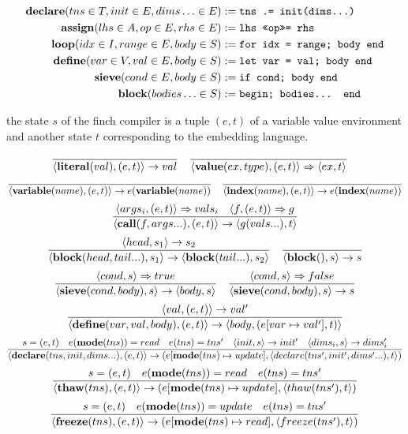 \begin{align*}
    \text{\textbf{declare}}(tns \in T, init \in E, dims\ldots \in E) &:= \text{\texttt{tns .= init(dims...)}} \\
    \text{\textbf{assign}}(lhs \in A, op \in E, rhs \in E) &:= \text{\texttt{lhs \texttt{<<op>>=} rhs}} \\
    \text{\textbf{loop}}(idx \in I, range \in E, body \in S) &:= \text{\texttt{for idx = range; body end}} \\
    \text{\textbf{define}}(var \in V, val \in E, body \in S) &:= \text{\texttt{let var = val; body end}} \\
    \text{\textbf{sieve}}(cond \in E, body \in S) &:= \text{\texttt{if cond; body end}} \\
    \text{\textbf{block}}(bodies\ldots \in S) &:= \text{\texttt{begin; bodies... end}}
\end{align*}

the state $s$ of the finch compiler is a tuple $(e, t)$ of a variable value
environment and another state $t$ corresponding to the embedding language.



\[
    \frac{}{\langle\text{\textbf{literal}}(val), (e, t)\rangle \rightarrow val} \quad
    \frac{}{\langle\text{\textbf{value}}(ex, type), (e, t)\rangle \Rightarrow \langle ex, t \rangle} \quad
\]
\[
    \frac{}{\langle\text{\textbf{variable}}(name), (e, t)\rangle \rightarrow e(\text{\textbf{variable}}(name))} \quad
    \frac{}{\langle\text{\textbf{index}}(name), (e, t)\rangle \rightarrow e(\text{\textbf{index}}(name))}
\]
\[
    \frac{\langle args_i, (e, t) \rangle \Rightarrow vals_i \quad \langle f, (e, t) \rangle \Rightarrow g}
    {\langle\text{\textbf{call}}(f, args...), (e, t)\rangle \rightarrow \langle g(vals...), t \rangle}
\]
\[
\frac{\langle head, s_1 \rangle \rightarrow s_2}
{\langle\text{\textbf{block}}(head, tail...), s_1 \rangle \rightarrow \langle \text{\textbf{block}}(tail...), s_2 \rangle} \quad
\frac{}{\langle\text{\textbf{block}}(), s\rangle \rightarrow s}
\]
\[
\frac{\langle cond, s \rangle \Rightarrow true}
{\langle\text{\textbf{sieve}}(cond, body), s\rangle \rightarrow \langle body, s \rangle}\quad
\frac{\langle cond, s \rangle \Rightarrow false}
{\langle\text{\textbf{sieve}}(cond, body), s\rangle \rightarrow s}
\]
\[
\frac{\langle val, (e, t) \rangle \rightarrow val'}
{\langle\text{\textbf{define}}(var, val, body), (e, t)\rangle \rightarrow \langle body, (e[var \mapsto val'], t) \rangle}
\]
\[
\frac{s = (e, t) \quad e(\text{\textbf{mode}}(tns)) = read \quad e(tns) = tns' \quad  \langle init, s \rangle \rightarrow init' \quad  \langle dims_i, s \rangle \rightarrow dims_i'}
{\langle\text{\textbf{declare}}(tns, init, dims...), (e, t)\rangle \rightarrow (e [\text{\textbf{mode}}(tns) \mapsto update], \langle declare(tns', init', dims'...), t \rangle)}
\]
\[
\frac{s = (e, t) \quad e(\text{\textbf{mode}}(tns)) = read \quad e(tns) = tns'}
{\langle\text{\textbf{thaw}}(tns), (e, t)\rangle \rightarrow (e [\text{\textbf{mode}}(tns) \mapsto update], \langle thaw(tns'), t \rangle)}
\]
\[
\frac{s = (e, t) \quad e(\text{\textbf{mode}}(tns)) = update \quad e(tns) = tns'}
{\langle\text{\textbf{freeze}}(tns), (e, t)\rangle \rightarrow (e [\text{\textbf{mode}}(tns) \mapsto read], \langle freeze(tns'), t \rangle)}
\]

